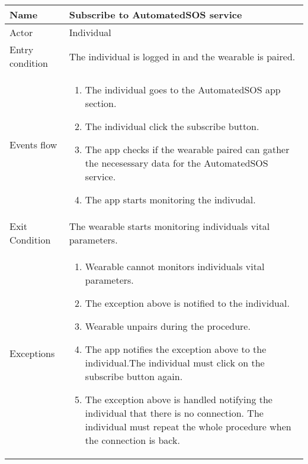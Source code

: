 \begin{tabular}{|l|p{13cm}|}
    \hline
    Name & Subscribe to AutomatedSOS service
    \\ \hline
    Actor & Individual
    \\ \hline 
    Entry condition & The individual is logged in and the wearable is paired.
        \\ \hline
    Events flow &
    \begin{enumerate}
	\item The individual goes to the AutomatedSOS app section.
    \item The individual click the subscribe button.
    \item The app checks if the wearable paired can gather the necesessary data for the AutomatedSOS service.
    \item The app starts monitoring the indivudal.
    \end{enumerate}
     \\ \hline
     Exit Condition & The wearable starts monitoring individuals vital parameters.
     \\
    \hline
    Exceptions &
        \begin{enumerate}
    \item Wearable cannot monitors individuals vital parameters.
    \item The exception above is notified to the individual.
    \item Wearable unpairs during the procedure.
    \item The app notifies the exception above to the individual.The individual must click on the subscribe button again.
    \item The exception above is handled notifying the individual that there is no connection. The individual must repeat the whole procedure when the connection is back.
    \end{enumerate}
      \\
\end{tabular}


